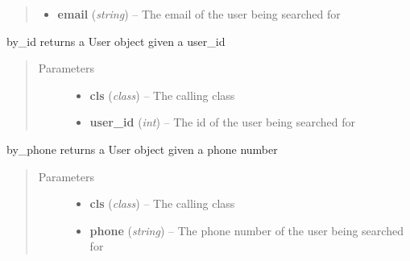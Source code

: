 \documentclass[letterpaper,10pt,english]{sphinxmanual}
\begin{document}
\begin{fulllineitems}
\begin{fulllineitems}
\begin{quote}
\begin{description}
\begin{itemize}
\item {} 
\textbf{email} (\emph{string}) -- The email of the user being searched for

\end{itemize}

\end{description}\end{quote}

\end{fulllineitems}


\begin{fulllineitems}
\label{dev-patients:cagenix.patients.models.Patient.by_id}
by\_id returns a User object given a user\_id
\begin{quote}\begin{description}
\item[{Parameters}] \leavevmode\begin{itemize}
\item {} 
\textbf{cls} (\emph{class}) -- The calling class

\item {} 
\textbf{user\_id} (\emph{int}) -- The id of the user being searched for

\end{itemize}

\end{description}\end{quote}

\end{fulllineitems}


\begin{fulllineitems}
\label{dev-patients:cagenix.patients.models.Patient.by_phone}
by\_phone returns a User object given a phone number
\begin{quote}\begin{description}
\item[{Parameters}] \leavevmode\begin{itemize}
\item {} 
\textbf{cls} (\emph{class}) -- The calling class

\item {} 
\textbf{phone} (\emph{string}) -- The phone number of the user being searched for

\end{itemize}

\end{description}\end{quote}

\end{fulllineitems}


\end{fulllineitems}
\end{document}

